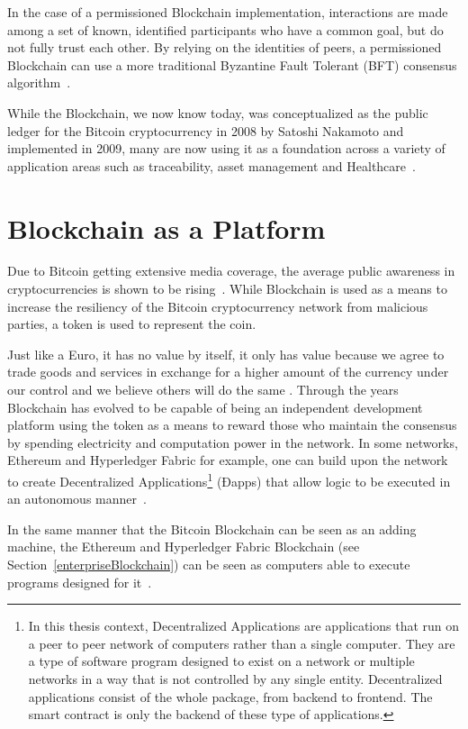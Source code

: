 In the case of a permissioned Blockchain implementation, interactions are made
among a set of known, identified participants who have a common goal, but do
not fully trust each other. By relying on the identities of peers, a
permissioned Blockchain can use a more traditional Byzantine Fault Tolerant
(BFT) consensus algorithm~\cite{Sousa2018,byzantine2018}.

While the Blockchain, we now know today, was conceptualized as the public
ledger for the Bitcoin cryptocurrency in 2008 by Satoshi Nakamoto and
implemented in 2009, many are now using it as a foundation across a variety of
application areas such as traceability, asset management and
Healthcare~\cite{MIT2016}.

\section{Blockchain as a Platform} \label{blockchainasaPlatform}

Due to Bitcoin getting extensive media coverage, the average public awareness
in cryptocurrencies is shown to be rising~\cite{BitAwareness2017}. While
Blockchain is used as a means to increase the resiliency of the Bitcoin
cryptocurrency network from malicious parties, a token is used to represent the
coin. 

Just like a Euro, it has no value by itself, it only has value because we agree
to trade goods and services in exchange for a higher amount of the currency
under our control and we believe others will do the same \cite{aliessi2016}.
Through the years Blockchain has evolved to be capable of being an independent
development platform using the token as a means to reward those who maintain
the consensus by spending electricity and computation power in the network. In
some networks, Ethereum and Hyperledger Fabric for example, one can build upon
the network to create Decentralized Applications\footnote{In this thesis
context, Decentralized Applications are applications that run on a peer to peer
network of computers rather than a single computer. They are a type of software
program designed to exist on a network or multiple networks in a way that is
not controlled by any single entity. Decentralized applications consist of the
whole package, from backend to frontend. The smart contract is only the backend
of these type of applications.} (Ðapps) that allow logic to be executed in an
autonomous manner~\cite{Wood2017}. 

In the same manner that the Bitcoin Blockchain can be seen as an adding
machine, the Ethereum and Hyperledger Fabric Blockchain (see
Section~\ref{enterpriseBlockchain}) can be seen as computers able to execute
programs designed for it~\cite{Wood2015}.

